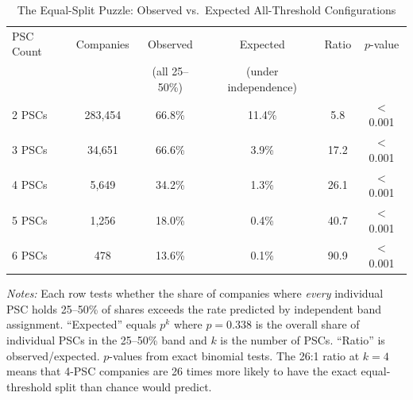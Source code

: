 \begin{table}[t]
\centering
\begin{threeparttable}
\caption{The Equal-Split Puzzle: Observed vs.~Expected All-Threshold Configurations}
\label{tab:config}
\begin{tabular}{lccccc}
\toprule
PSC Count & Companies & Observed & Expected & Ratio & $p$-value \\
 & & (all 25--50\%) & (under independence) & & \\
\midrule
2 PSCs & 283,454 & 66.8\% & 11.4\% & 5.8 & $<$0.001 \\
3 PSCs & 34,651 & 66.6\% & 3.9\% & 17.2 & $<$0.001 \\
4 PSCs & 5,649 & 34.2\% & 1.3\% & 26.1 & $<$0.001 \\
5 PSCs & 1,256 & 18.0\% & 0.4\% & 40.7 & $<$0.001 \\
6 PSCs & 478 & 13.6\% & 0.1\% & 90.9 & $<$0.001 \\
\bottomrule
\end{tabular}
\begin{tablenotes}[flushleft]\small
\item \textit{Notes:} Each row tests whether the share of companies where \textit{every} individual PSC holds 25--50\% of shares exceeds the rate predicted by independent band assignment. ``Expected'' equals $p^k$ where $p = 0.338$ is the overall share of individual PSCs in the 25--50\% band and $k$ is the number of PSCs. ``Ratio'' is observed/expected. $p$-values from exact binomial tests. The 26:1 ratio at $k=4$ means that 4-PSC companies are 26 times more likely to have the exact equal-threshold split than chance would predict.
\end{tablenotes}
\end{threeparttable}
\end{table}
